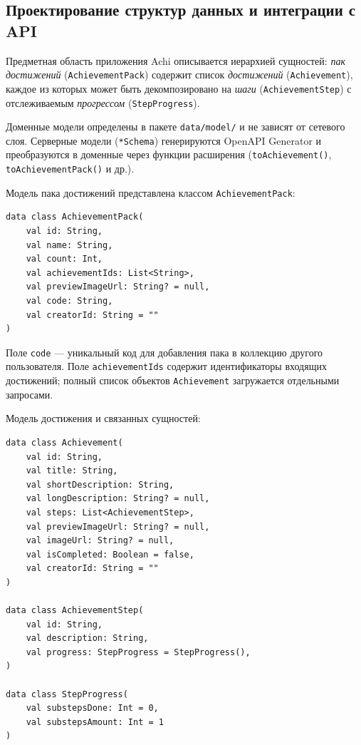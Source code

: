 \documentclass[../main.tex]{subfiles}
\begin{document}
\subsection{Проектирование структур данных и интеграции с API}

Предметная область приложения Achi описывается иерархией сущностей: \emph{пак достижений} (\texttt{AchievementPack}) содержит список \emph{достижений} (\texttt{Achievement}), каждое из которых может быть декомпозировано на \emph{шаги} (\texttt{AchievementStep}) с отслеживаемым \emph{прогрессом} (\texttt{StepProgress}).

Доменные модели определены в пакете \texttt{data/model/} и не зависят от сетевого слоя. Серверные модели (\texttt{*Schema}) генерируются OpenAPI Generator и преобразуются в доменные через функции расширения (\texttt{toAchievement()}, \texttt{toAchievementPack()} и др.).

Модель пака достижений представлена классом \texttt{AchievementPack}:

\begin{lstlisting}[caption={Доменная модель пака достижений}, label={lst:achievement-pack}]
data class AchievementPack(
    val id: String,
    val name: String,
    val count: Int,
    val achievementIds: List<String>,
    val previewImageUrl: String? = null,
    val code: String,
    val creatorId: String = ""
)
\end{lstlisting}

Поле \texttt{code} --- уникальный код для добавления пака в коллекцию другого пользователя. Поле \texttt{achievementIds} содержит идентификаторы входящих достижений; полный список объектов \texttt{Achievement} загружается отдельными запросами.

Модель достижения и связанных сущностей:

\begin{lstlisting}[caption={Доменные модели достижения, шага и прогресса}, label={lst:achievement-models}]
data class Achievement(
    val id: String,
    val title: String,
    val shortDescription: String,
    val longDescription: String? = null,
    val steps: List<AchievementStep>,
    val previewImageUrl: String? = null,
    val imageUrl: String? = null,
    val isCompleted: Boolean = false,
    val creatorId: String = ""
)

data class AchievementStep(
    val id: String,
    val description: String,
    val progress: StepProgress = StepProgress(),
)

data class StepProgress(
    val substepsDone: Int = 0,
    val substepsAmount: Int = 1
)
\end{lstlisting}
\end{document}
